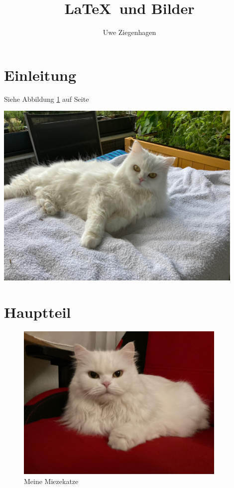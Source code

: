 \documentclass[12pt,ngerman,parskip=half]{scrartcl}
\author{Uwe Ziegenhagen}
\title{\LaTeX\ und Bilder}
\begin{document}
\maketitle

\tableofcontents

\listoffigures


\section{Einleitung}

Siehe Abbildung \ref{fig:katze} auf Seite \pageref{fig:katze}

\blindtext[2]

\includegraphics[width=12cm]{Bilder/Katze1}

\blindtext[2]

\section{Hauptteil}\label{sec:hauptteil}

\blindtext[2]


\begin{figure}[h]
\begin{center}
\includegraphics[width=0.9\textwidth]{Bilder/Katze}
\caption{Meine Miezekatze}\label{fig:katze}
\end{center}
\end{figure}


\blindtext[2]
\end{document}
